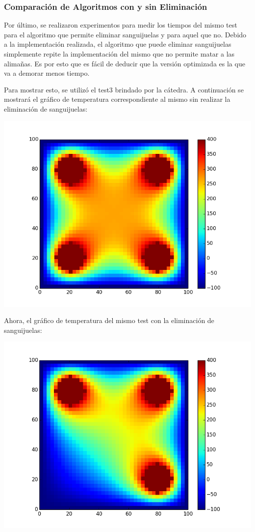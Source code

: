 \subsubsection{Comparación de Algoritmos con y sin Eliminación}
	Por último, se realizaron experimentos para medir los tiempos del mismo test para el algoritmo que permite eliminar sanguijuelas y para aquel que no. 
	Debido a la implementación realizada, el algoritmo que puede eliminar sanguijuelas simplemente repite la implementación del mismo que no permite matar a las alimañas. Es por esto que es fácil de deducir que la versión optimizada es la que va a demorar menos tiempo. 
	\par 
	Para mostrar esto, se utilizó el test3 brindado por la cátedra. A continuación se mostrará el gráfico de temperatura correspondiente al mismo sin realizar la eliminación de sanguijuelas:
	
	\begin{center}
		\includegraphics[scale=0.5]{./img/test3.png}
	\end{center}
	
	Ahora, el gráfico de temperatura del mismo test con la eliminación de sanguijuelas:
	
	\begin{center}
		\includegraphics[scale=0.5]{./img/test3_con_kil.png}
	\end{center}
	
